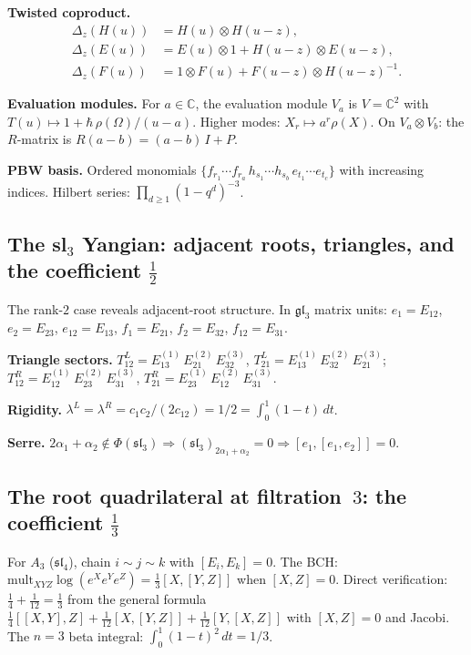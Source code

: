 \documentclass[11pt]{article}
\newcommand{\C}{\mathbb{C}}
\begin{document}
\medskip\noindent\textbf{Twisted coproduct.}\enspace
\begin{align*}
\Delta_z(H(u)) &= H(u) \otimes H(u{-}z), \\
\Delta_z(E(u)) &= E(u) \otimes 1 + H(u{-}z) \otimes E(u{-}z), \\
\Delta_z(F(u)) &= 1 \otimes F(u) + F(u{-}z) \otimes H(u{-}z)^{-1}.
\end{align*}

\medskip\noindent\textbf{Evaluation modules.}\enspace
For $a \in \C$, the evaluation module $V_a$ is
$V = \C^2$ with $T(u) \mapsto 1 + \hbar\,\rho(\Omega)/(u-a)$.
Higher modes: $X_r \mapsto a^r \rho(X)$.
On $V_a \otimes V_b$: the $R$-matrix is $R(a{-}b) = (a{-}b)\,I + P$.

\medskip\noindent\textbf{PBW basis.}\enspace
Ordered monomials $\{f_{r_1}\cdots f_{r_a}\,h_{s_1}\cdots h_{s_b}\,
e_{t_1}\cdots e_{t_c}\}$ with increasing indices.
Hilbert series: $\prod_{d \ge 1}(1-q^d)^{-3}$.


\subsection{The sl$_3$ Yangian: adjacent roots, triangles, and the coefficient $\frac12$}

The rank-$2$ case reveals adjacent-root structure.  In $\mathfrak{gl}_3$
matrix units: $e_1 = E_{12}$, $e_2 = E_{23}$, $e_{12} = E_{13}$,
$f_1 = E_{21}$, $f_2 = E_{32}$, $f_{12} = E_{31}$.

\medskip\noindent\textbf{Triangle sectors.}\enspace
$T^L_{12} = E_{13}^{(1)}\,E_{21}^{(2)}\,E_{32}^{(3)}$,
$T^L_{21} = E_{13}^{(1)}\,E_{32}^{(2)}\,E_{21}^{(3)}$;
$T^R_{12} = E_{12}^{(1)}\,E_{23}^{(2)}\,E_{31}^{(3)}$,
$T^R_{21} = E_{23}^{(1)}\,E_{12}^{(2)}\,E_{31}^{(3)}$.

\medskip\noindent\textbf{Rigidity.}\enspace
$\lambda^L = \lambda^R = c_1 c_2/(2c_{12}) = 1/2 = \int_0^1(1-t)\,dt$.

\medskip\noindent\textbf{Serre.}\enspace
$2\alpha_1 + \alpha_2 \notin \Phi(\mathfrak{sl}_3) \Rightarrow
(\mathfrak{sl}_3)_{2\alpha_1+\alpha_2} = 0 \Rightarrow
[e_1,[e_1,e_2]] = 0$.


\subsection{The root quadrilateral at filtration~$3$: the coefficient $\frac13$}

For $A_3$ ($\mathfrak{sl}_4$), chain $i \sim j \sim k$ with
$[E_i, E_k] = 0$.  The BCH: $\mathrm{mult}_{XYZ}\log(e^X e^Y e^Z) =
\frac13[X,[Y,Z]]$ when $[X,Z] = 0$.  Direct verification:
$\frac14 + \frac{1}{12} = \frac13$ from the general formula
$\frac14[[X,Y],Z] + \frac{1}{12}[X,[Y,Z]] + \frac{1}{12}[Y,[X,Z]]$
with $[X,Z] = 0$ and Jacobi.  The $n=3$ beta integral:
$\int_0^1(1-t)^2\,dt = 1/3$.
\end{document}
